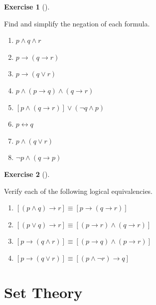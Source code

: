\documentclass[
  letterpaper,
  10pt,
  reqno,
  twopage,
  openany]{book}
\providecommand{\tightlist}{%
  \setlength{\itemsep}{0pt}\setlength{\parskip}{0pt}}\usepackage{longtable,booktabs,array}
\theoremstyle{plain}
\theoremstyle{definition}
\newtheorem{exercise}{Exercise}[chapter]
\theoremstyle{definition}
\theoremstyle{definition}
\theoremstyle{plain}
\theoremstyle{plain}
\theoremstyle{remark}
\begin{document}
\leavevmode{}%
\begin{exercise}[]\label{exr-simplify-the-negation}

Find and simplify the negation of each formula.

\begin{enumerate}
\def\labelenumi{\arabic{enumi}.}
\tightlist
\item
  \(p\land q \land r\)
\item
  \(p\rightarrow (q\rightarrow r)\)
\item
  \(p\rightarrow (q\lor r)\)
\item
  \(p\land (p\rightarrow q)\land (q\rightarrow r)\)
\item
  \([p\land (q\rightarrow r)]\lor (\neg q\land p)\)
\item
  \(p\leftrightarrow q\)
\item
  \(p\land (q\lor r)\)
\item
  \(\neg p \land (q\rightarrow p)\)
\end{enumerate}

\end{exercise}

\leavevmode{}%
\begin{exercise}[]\label{exr-verify-logical-equivalencies}

Verify each of the following logical equivalencies.

\begin{enumerate}
\def\labelenumi{\arabic{enumi}.}
\tightlist
\item
  \([(p\land q)\rightarrow r]\equiv [p\rightarrow (q\rightarrow r)]\)
\item
  \([(p\lor q)\rightarrow r]\equiv[(p\rightarrow r)\land (q\rightarrow r)]\)
\item
  \([p\rightarrow (q\land r)]\equiv[(p \rightarrow q)\land (p\rightarrow r)]\)
\item
  \([p\rightarrow (q\lor r)]\equiv[(p\land \neg r)\rightarrow q]\)
\end{enumerate}

\end{exercise}


\hypertarget{set-theory}{%
\chapter{Set Theory}\label{set-theory}}
\end{document}
